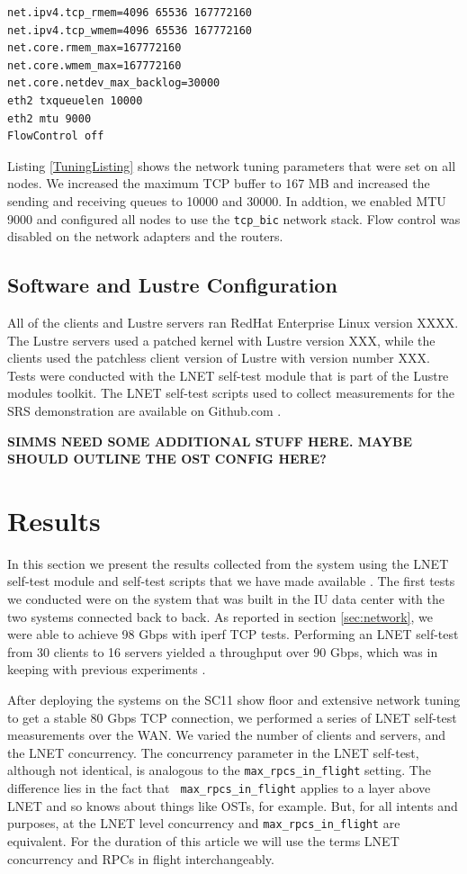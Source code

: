 \documentclass[]{sigplan-proc}
\begin{document}
\lstset{language=Bash, caption=Tuning parameters for the network, label=TuningListing}
\begin{lstlisting}
net.ipv4.tcp_rmem=4096 65536 167772160
net.ipv4.tcp_wmem=4096 65536 167772160
net.core.rmem_max=167772160
net.core.wmem_max=167772160
net.core.netdev_max_backlog=30000
eth2 txqueuelen 10000
eth2 mtu 9000
FlowControl off 
\end{lstlisting}

Listing \ref{TuningListing} shows the network tuning parameters that were set on all nodes. We increased the maximum TCP buffer to 167 MB and increased the sending and receiving queues to 10000 and 30000. In addtion, we enabled MTU 9000 and configured all nodes to use the \texttt{tcp\_bic} network stack. Flow control was disabled on the network adapters and the routers.

\subsection{Software and Lustre Configuration}

All of the clients and Lustre servers ran RedHat Enterprise Linux version XXXX. The Lustre servers used a
patched kernel with Lustre version XXX, while the clients used the patchless client version of Lustre with
version number XXX. Tests were conducted with the LNET self-test module that is part of the Lustre modules
toolkit. The LNET self-test scripts used to collect measurements for the SRS demonstration are available on
Github.com \cite{lstgithub2011}.

{\bf SIMMS NEED SOME ADDITIONAL STUFF HERE. MAYBE SHOULD OUTLINE THE OST CONFIG HERE?}

\section{Results}\label{sec:results}

In this section we present the results collected from the system using the LNET self-test module and self-test
scripts that we have made available \cite{lstgithub2011}. The first tests we conducted were on the system that
was built in the IU data center with the two systems connected back to back. As reported in section
\ref{sec:network}, we were able to achieve 98 Gbps with iperf TCP tests. Performing an LNET self-test from 30
clients to 16 servers yielded a throughput over 90 Gbps, which was in keeping with previous experiments
\cite{kluge2012}.

After deploying the systems on the SC11 show floor and extensive network tuning to get a stable 80 Gbps TCP
connection, we performed a series of LNET self-test measurements over the WAN. We varied the number of clients
and servers, and the LNET concurrency. The concurrency parameter in the LNET self-test, although not
identical, is analogous to the {\tt max\_rpcs\_in\_flight} setting. The difference lies in the fact that {\tt
  max\_rpcs\_in\_flight} applies to a layer above LNET and so knows about things like OSTs, for example. But,
for all intents and purposes, at the LNET level concurrency and {\tt max\_rpcs\_in\_flight} are
equivalent. For the duration of this article we will use the terms LNET concurrency and RPCs in flight
interchangeably.  
\end{document}
